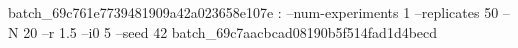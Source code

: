 batch_69c761e7739481909a42a023658e107e : --num-experiments 1 --replicates 50 --N 20 --r 1.5 --i0 5 --seed 42
batch_69c7aacbcad08190b5f514fad1d4becd



